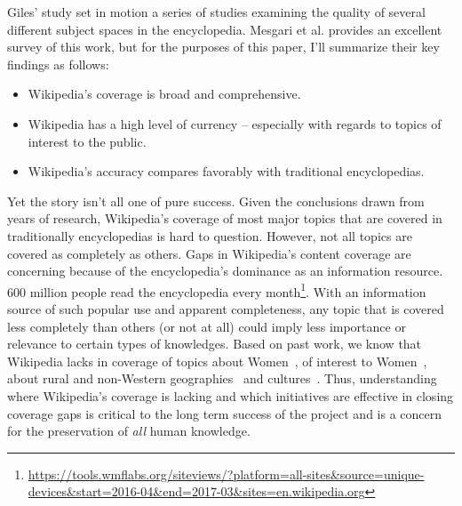 Giles' study set in motion a series of studies examining the quality of several different subject spaces in the encyclopedia.  Mesgari et al. provides an excellent survey of this work\cite{mesgari15sum}, but for the purposes of this paper, I'll summarize their key findings as follows:

\begin{itemize}
\item Wikipedia's coverage is broad and comprehensive.
\item Wikipedia has a high level of currency -- especially with regards to topics of interest to the public.
\item Wikipedia's accuracy compares favorably with traditional encyclopedias.
\end{itemize}

Yet the story isn't all one of pure success.  Given the conclusions drawn from years of research, Wikipedia's coverage of most major topics that are covered in traditionally encyclopedias is hard to question.  However, not all topics are covered as completely as others.  Gaps in Wikipedia's content coverage are concerning because of the encyclopedia's dominance as an information resource.  600 million people read the encyclopedia every month\footnote{\url{https://tools.wmflabs.org/siteviews/?platform=all-sites&source=unique-devices&start=2016-04&end=2017-03&sites=en.wikipedia.org}}.  With an information source of such popular use and apparent completeness, any topic that is covered less completely than others (or not at all) could imply less importance or relevance to certain types of knowledges.  Based on past work, we know that Wikipedia lacks in coverage of topics about Women~\cite{reagle11gender}, of interest to Women~\cite{lam11clubhouse}, about rural and non-Western geographies~\cite{johnson16home,hecht09measuring} and cultures~\cite{graham14uneven}.  Thus, understanding where Wikipedia's coverage is lacking and which initiatives are effective in closing coverage gaps is critical to the long term success of the project and is a concern for the preservation of \emph{all} human knowledge.
